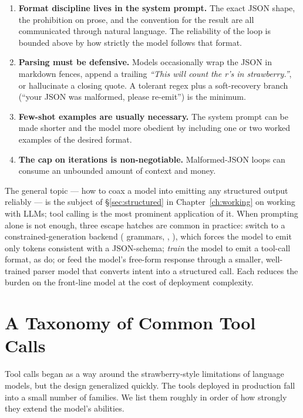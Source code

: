 \begin{enumerate}[label=(\arabic*)]
\item \textbf{Format discipline lives in the system prompt.} The
  exact JSON shape, the prohibition on prose, and the convention for
  the result are all communicated through natural language. The
  reliability of the loop is bounded above by how strictly the model
  follows that format.
\item \textbf{Parsing must be defensive.} Models occasionally wrap
  the JSON in markdown fences, append a trailing
  \emph{``This will count the r's in strawberry.''}, or hallucinate a
  closing quote. A tolerant regex plus a soft-recovery branch (``your
  JSON was malformed, please re-emit'') is the minimum.
\item \textbf{Few-shot examples are usually necessary.} The system
  prompt can be made shorter and the model more obedient by including
  one or two worked examples of the desired format.
\item \textbf{The cap on iterations is non-negotiable.} Malformed-JSON
  loops can consume an unbounded amount of context and money.
\end{enumerate}

The general topic --- how to coax a model into emitting any
structured output reliably --- is the subject of
\S\ref{sec:structured} in Chapter~\ref{ch:working} on working with
LLMs; tool calling is the most prominent application of it.
When prompting alone is not enough, three escape hatches are common
in practice: switch to a constrained-generation backend
( grammars, ,
), which forces the model to emit only
tokens consistent with a JSON-schema; \emph{train} the model to emit
a tool-call format, as \citet{schick2023toolformer} do; or feed the
model's free-form response through a smaller, well-trained parser
model that converts intent into a structured call. Each reduces the
burden on the front-line model at the cost of deployment complexity.

\section{A Taxonomy of Common Tool Calls}
\label{sec:taxonomy}

Tool calls began as a way around the strawberry-style limitations of
language models, but the design generalized quickly. The tools
deployed in production fall into a small number of families. We list
them roughly in order of how strongly they extend the model's
abilities.

